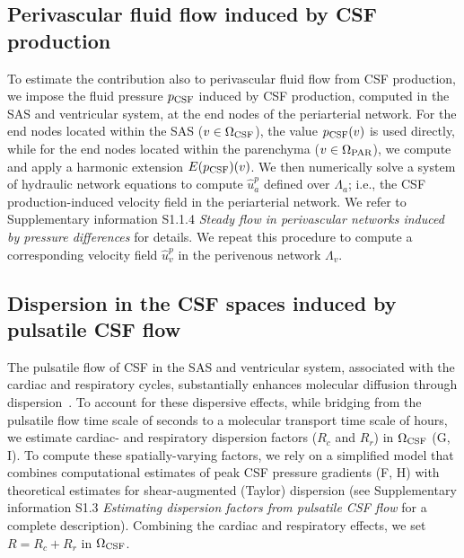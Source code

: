 \documentclass[fleqn,10pt]{wlscirep}
\begin{document}

\subsection*{Perivascular fluid flow induced by CSF production}

To estimate the contribution also to perivascular fluid flow from CSF
production, we impose the fluid pressure $p_{\rm CSF}$ induced by CSF
production, computed in the SAS and ventricular system, at the end
nodes of the periarterial network. For the end nodes located within
the SAS ($v \in \Omega_{\rm CSF}$), the value $p_{\rm CSF}(v)$ is used
directly, while for the end nodes located within the parenchyma ($v \in
\Omega_{\rm PAR}$), we compute and apply a harmonic extension
$E(p_{\rm CSF})(v)$. We then numerically solve a system of hydraulic
network equations to compute $\hat{u}^p_a$ defined over $\Lambda_a$;
i.e., the CSF production-induced velocity field in the periarterial
network. We refer to Supplementary information S1.1.4 \emph{Steady
flow in perivascular networks induced by pressure differences} for
details. We repeat this procedure to compute a corresponding velocity
field $\hat{u}^p_v$ in the perivenous network $\Lambda_v$.

\subsection*{Dispersion in the CSF spaces induced by pulsatile CSF flow}

The pulsatile flow of CSF in the SAS and ventricular system,
associated with the cardiac and respiratory cycles, substantially
enhances molecular diffusion through
dispersion~\cite{taylor1953dispersion, watson1983diffusion,
  asgari2016glymphatic, sharp2019dispersion, ray2021quantitative,
  troyetsky2021dispersion}. To account for these dispersive effects,
while bridging from the pulsatile flow time scale of seconds to a
molecular transport time scale of hours, we estimate cardiac- and
respiratory dispersion factors ($R_c$ and $R_r$) in $\Omega_{\rm CSF}$
(G, I). To compute these spatially-varying factors, we rely on a simplified model that combines computational estimates of peak CSF pressure gradients
(F, H) with theoretical estimates for shear-augmented
(Taylor) dispersion \cite{taylor1953dispersion, watson1983diffusion,
  sharp2019dispersion} (see Supplementary information S1.3 \emph{Estimating
dispersion factors from pulsatile CSF flow} for a complete
description). Combining the cardiac and respiratory effects, we set $R
= R_c + R_r$ in $\Omega_{\rm CSF}$. 
\end{document}
